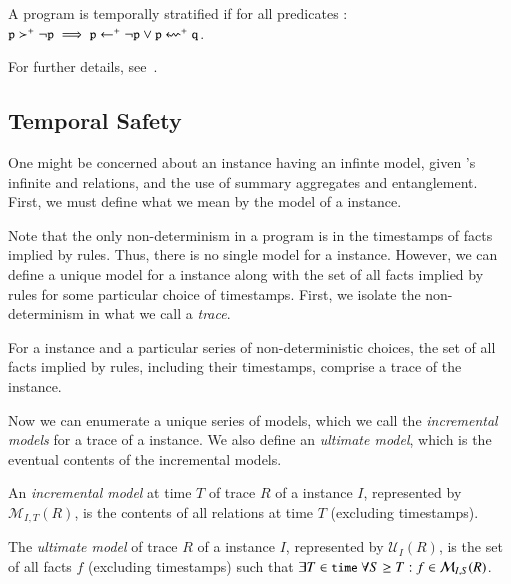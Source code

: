 \begin{definition}
%
A \lang program is temporally stratified if for all predicates :
$\dedalus{p} \succ^+ \lnot \dedalus{p} \implies \dedalus{p} \gets^+ \lnot
\dedalus{p} \lor \dedalus{p} \leftsquigarrow^+ \dedalus{q}$.
%
\end{definition}

For further details, see~\cite{dedalus-techr}.

\subsection{Temporal Safety}


One might be concerned about an instance having an infinte model, given \lang's
infinite  and  relations, and the use of
summary aggregates and entanglement.  First, we must define what we mean by the
model of a \lang instance.

Note that the only non-determinism in a \lang program is in the timestamps of
facts implied by  rules.  Thus, there is no single model for a
\lang instance.  However, we can define a unique model for a \lang instance
along with the set of all facts implied by  rules for some
particular choice of timestamps.  First, we isolate the non-determinism in what
we call a {\em trace}.

\begin{definition}
%
For a \lang instance and a particular series of non-deterministic choices, the
set of all facts implied by  rules, including their timestamps,
comprise a trace of the instance.
%
\end{definition}

Now we can enumerate a unique series of models, which we call the {\em incremental
models} for a trace of a \lang instance.  We also define an {\em ultimate
model}, which is the eventual contents of the incremental models.

\begin{definition}
%
An {\em incremental model} at time $T$ of trace $R$ of a \lang instance $I$,
represented by $\mathcal{M}_{I,T}(R)$, is the contents of all
relations at time $T$ (excluding timestamps).
%
\end{definition}

\begin{definition}
%
The {\em ultimate model} of trace $R$ of a \lang instance $I$, represented by
$\mathcal{U}_{I}(R)$, is the set of all facts $f$ (excluding timestamps) such
that $\exists T \in \dedalus{time}~\forall S \geq T: f \in
\mathcal{M}_{I,S}(R)$.
%
\end{definition}

